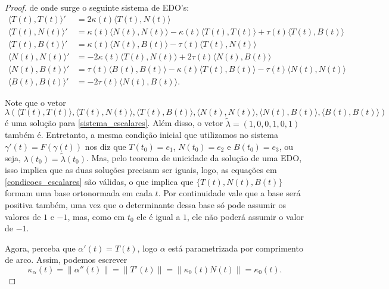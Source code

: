 \documentclass[11pt,letterpaper,twocolumn]{article}
\begin{document}
\begin{proof}
    \noindent de onde surge o seguinte sistema de EDO's:
    \begin{equation}
        \begin{split}
            \langle T(t), T(t)\rangle' & = 2\kappa(t) \langle T(t), N(t)\rangle \\
            \langle T(t), N(t)\rangle' & = \kappa(t) \langle N(t), N(t)\rangle - \kappa(t) \langle T(t), T(t)\rangle + \tau(t) \langle T(t), B(t)\rangle \\
            \langle T(t), B(t)\rangle' & = \kappa(t) \langle N(t), B(t)\rangle - \tau(t) \langle T(t), N(t)\rangle \\
            \langle N(t), N(t)\rangle' & = - 2\kappa(t) \langle T(t), N(t)\rangle + 2\tau(t) \langle N(t), B(t)\rangle \\
            \langle N(t), B(t)\rangle' & = \tau(t) \langle B(t), B(t)\rangle - \kappa(t) \langle T(t), B(t)\rangle - \tau(t) \langle N(t), N(t)\rangle \\
            \langle B(t), B(t)\rangle' & = -2\tau(t) \langle N(t), B(t)\rangle.
        \end{split}
        \label{sistema_escalares}
    \end{equation}
    
    Note que o vetor $\lambda\left(\langle T(t), T(t)\rangle, \langle T(t), N(t)\rangle, \langle T(t), B(t)\rangle, \langle N(t), N(t)\rangle, \langle N(t), B(t)\rangle, \langle B(t), B(t)\rangle\right)$ é uma solução para \ref{sistema_escalares}. Além disso, o vetor $\tilde{\lambda} = (1, 0, 0, 1, 0, 1)$ também é. Entretanto, a mesma condição inicial que utilizamos no sistema $\gamma'(t) = F(\gamma(t))$ nos diz que $T(t_0) = e_1$, $N(t_0) = e_2$ e $B(t_0) = e_3$, ou seja, $\lambda(t_0) = \tilde{\lambda}(t_0)$. Mas, pelo teorema de unicidade da solução de uma EDO, isso implica que as duas soluções precisam ser iguais, logo, as equações em \ref{condicoes_escalares} são válidas, o que implica que $\{T(t), N(t), B(t)\}$ formam uma base ortonormada em cada $t$. Por continuidade vale que a base será positiva também, uma vez que o determinante dessa base só pode assumir os valores de $1$ e $-1$, mas, como em $t_0$ ele é igual a $1$, ele não poderá assumir o valor de $-1$.
    
    Agora, perceba que $\alpha'(t) = T(t)$, logo $\alpha$ está parametrizada por comprimento de arco. Assim, podemos escrever
    \[\kappa_\alpha(t) = \|\alpha''(t)\| = \|T'(t)\| = \|\kappa_0(t)N(t)\| = \kappa_0(t).\]
    

\end{proof}
\end{document}
